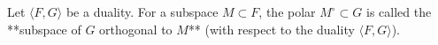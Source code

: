 Let $\langle F, G \rangle$ be a duality. For a subspace $M \subset F$, the polar $M^\circ \subset G$ is called the **subspace of $G$ orthogonal to $M$** (with respect to the duality $\langle F, G \rangle$).
